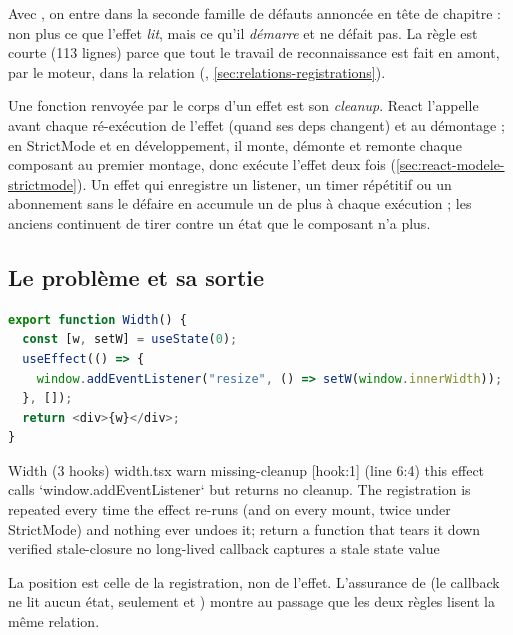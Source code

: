Avec , on entre dans la seconde famille de défauts annoncée en tête de chapitre : non plus ce que l'effet \emph{lit}, mais ce qu'il \emph{démarre} et ne défait pas. La règle est courte (113 lignes) parce que tout le travail de reconnaissance est fait en amont, par le moteur, dans la relation  (, \cref{sec:relations-registrations}).

\begin{react}
Une fonction renvoyée par le corps d'un effet est son \emph{cleanup}. React l'appelle avant chaque ré-exécution de l'effet (quand ses deps changent) et au démontage ; en StrictMode et en développement, il monte, démonte et remonte chaque composant au premier montage, donc exécute l'effet deux fois (\cref{sec:react-modele-strictmode}). Un effet qui enregistre un listener, un timer répétitif ou un abonnement sans le défaire en accumule un de plus à chaque exécution ; les anciens continuent de tirer contre un état que le composant n'a plus.
\end{react}

\subsection{Le problème et sa sortie}

\begin{lstlisting}[language=TypeScript,caption={\file{/tmp/ch20/width.tsx}, composant \code{Width} : un listener jamais retiré},label={lst:regles-effets-width}]
export function Width() {
  const [w, setW] = useState(0);
  useEffect(() => {
    window.addEventListener("resize", () => setW(window.innerWidth));
  }, []);
  return <div>{w}</div>;
}
\end{lstlisting}

\begin{sortie}
  Width  (3 hooks)  width.tsx
    warn   missing-cleanup  [hook:1]  (line 6:4)  this effect calls `window.addEventListener` but returns no cleanup. The registration is repeated every time the effect re-runs (and on every mount, twice under StrictMode) and nothing ever undoes it; return a function that tears it down
    verified  stale-closure  no long-lived callback captures a stale state value
\end{sortie}

La position est celle de la registration, non de l'effet. L'assurance de  (le callback ne lit aucun état, seulement  et ) montre au passage que les deux règles lisent la même relation.

